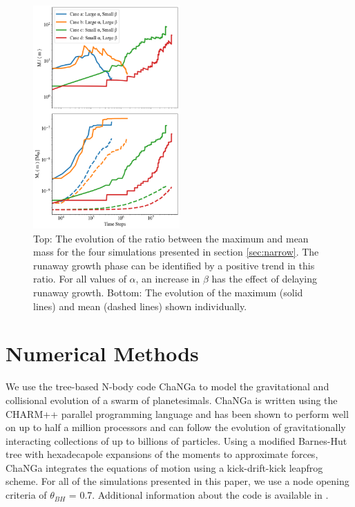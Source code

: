 \documentclass[twocolumn,linenumbers]{aastex63}
\begin{document}
\begin{figure}
\begin{center}
    \includegraphics[width=0.5\textwidth]{figures/alpha_beta_evo.png}
    \caption{Top: The evolution of the ratio between the maximum and mean mass for the four simulations presented
    in section \ref{sec:narrow}. The runaway growth phase can be identified by a positive trend in this ratio. For all values of 
    $\alpha$, an increase in $\beta$ has the effect of delaying runaway growth. Bottom: The evolution of the maximum
    (solid lines) and mean (dashed lines) shown individually.\label{fig:alpha_beta_evo}}
\end{center}
\end{figure}

\section{Numerical Methods}\label{sec:methods}

We use the tree-based N-body code {\sc ChaNGa} to model the gravitational and collisional evolution of a swarm of planetesimals. {\sc ChaNGa} is written using the {\sc CHARM++} parallel programming language and has been shown to perform well on up to half a million processors \citep{menon15} and can follow the evolution of gravitationally interacting collections of up to billions of particles. Using a modified Barnes-Hut tree with hexadecapole expansions of the moments to approximate forces, {\sc ChaNGa} integrates the equations of motion using a kick-drift-kick leapfrog scheme. For all of the simulations presented in this paper, we use a node opening criteria of $\theta_{BH}$ = 0.7. Additional information about the code is available in \citep{jetley08,menon15}.
\end{document}
